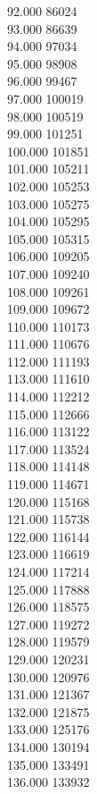 { 92.000	86024 \\
 93.000	86639 \\
 94.000	97034 \\
 95.000	98908 \\
 96.000	99467 \\
 97.000	100019 \\
 98.000	100519 \\
 99.000	101251 \\
 100.000	101851 \\
 101.000	105211 \\
 102.000	105253 \\
 103.000	105275 \\
 104.000	105295 \\
 105.000	105315 \\
 106.000	109205 \\
 107.000	109240 \\
 108.000	109261 \\
 109.000	109672 \\
 110.000	110173 \\
 111.000	110676 \\
 112.000	111193 \\
 113.000	111610 \\
 114.000	112212 \\
 115.000	112666 \\
 116.000	113122 \\
 117.000	113524 \\
 118.000	114148 \\
 119.000	114671 \\
 120.000	115168 \\
 121.000	115738 \\
 122.000	116144 \\
 123.000	116619 \\
 124.000	117214 \\
 125.000	117888 \\
 126.000	118575 \\
 127.000	119272 \\
 128.000	119579 \\
 129.000	120231 \\
 130.000	120976 \\
 131.000	121367 \\
 132.000	121875 \\
 133.000	125176 \\
 134.000	130194 \\
 135.000	133491 \\
 136.000	133932 \\
}
